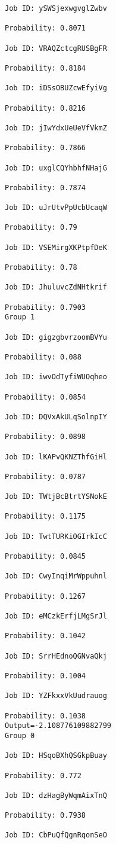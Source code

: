 \documentclass[11pt]{article}
\begin{document}
\begin{Verbatim}[commandchars=\\\{\}]
Job ID: ySWSjexwgvglZwbv

Probability: 0.8071

Job ID: VRAQZctcgRUSBgFR

Probability: 0.8184

Job ID: iDSsOBUZcwEfyiVg

Probability: 0.8216

Job ID: jIwYdxUeUeVfVkmZ

Probability: 0.7866

Job ID: uxglCQYhbhfNHajG

Probability: 0.7874

Job ID: uJrUtvPpUcbUcaqW

Probability: 0.79

Job ID: VSEMirgXKPtpfDeK

Probability: 0.78

Job ID: JhuluvcZdNHtkrif

Probability: 0.7903
Group 1

Job ID: gigzgbvrzoomBVYu

Probability: 0.088

Job ID: iwvOdTyfiWUOqheo

Probability: 0.0854

Job ID: DQVxAkULqSolnpIY

Probability: 0.0898

Job ID: lKAPvQKNZThfGiHl

Probability: 0.0787

Job ID: TWtjBcBtrtYSNokE

Probability: 0.1175

Job ID: TwtTURKiOGIrkIcC

Probability: 0.0845

Job ID: CwyInqiMrWppuhnl

Probability: 0.1267

Job ID: eMCzkErfjLMgSrJl

Probability: 0.1042

Job ID: SrrHEdnoQGNvaQkj

Probability: 0.1004

Job ID: YZFkxxVkUudrauog

Probability: 0.1038
Output=-2.108776109882799
Group 0

Job ID: HSqoBXhQSGkpBuay

Probability: 0.772

Job ID: dzHagByWqmAixTnQ

Probability: 0.7938

Job ID: CbPuQfQgnRqonSeO


\end{Verbatim}
\end{document}

